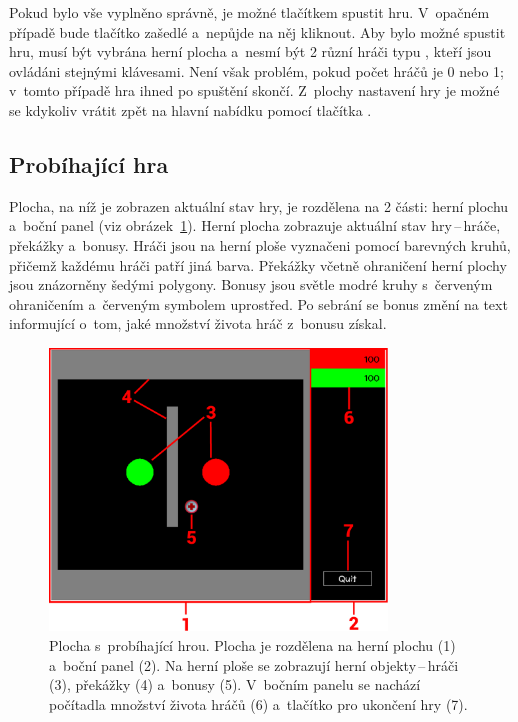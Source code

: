 Pokud bylo vše vyplněno správně, je možné tlačítkem  spustit hru. V~opačném případě bude tlačítko zašedlé a~nepůjde na něj kliknout. Aby bylo možné spustit hru, musí být vybrána herní plocha a~nesmí být 2 různí hráči typu , kteří jsou ovládáni stejnými klávesami. Není však problém, pokud počet hráčů je 0 nebo 1; v~tomto případě hra ihned po spuštění skončí. Z~plochy nastavení hry je možné se kdykoliv vrátit zpět na hlavní nabídku pomocí tlačítka .

\subsection*{Probíhající hra}

Plocha, na níž je zobrazen aktuální stav hry, je rozdělena na 2 části: herní plochu a~boční panel (viz obrázek~\ref{fig:in-game}). Herní plocha zobrazuje aktuální stav hry\,--\,hráče, překážky a~bonusy. Hráči jsou na herní ploše vyznačeni pomocí barevných kruhů, přičemž každému hráči patří jiná barva. Překážky včetně ohraničení herní plochy jsou znázorněny šedými polygony. Bonusy jsou světle modré kruhy s~červeným ohraničením a~červeným symbolem  uprostřed. Po sebrání se bonus změní na text informující o~tom, jaké množství života hráč z~bonusu získal.

\begin{figure}[ht]
    \centering
    \includegraphics[width=0.8\textwidth]{obrazky-figures/in-game.pdf}
    \caption{Plocha s~probíhající hrou. Plocha je rozdělena na herní plochu (1) a~boční panel (2). Na herní ploše se zobrazují herní objekty\,--\,hráči (3), překážky (4) a~bonusy (5). V~bočním panelu se nachází počítadla množství života hráčů (6) a~tlačítko pro ukončení hry (7).}
    \label{fig:in-game}
\end{figure}

